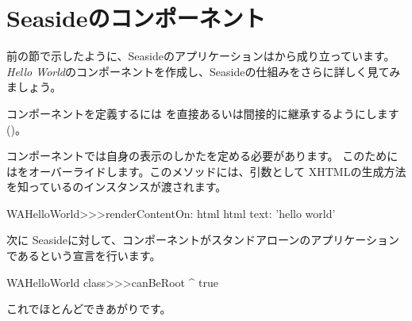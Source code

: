 \documentclass[a4paper,10pt,twoside]{book}
\begin{document}
\section{Seasideのコンポーネント}


前の節で示したように、Seasideのアプリケーションは\emph{}から成り立っています。
\emph{Hello World}のコンポーネントを作成し、Seasideの仕組みをさらに詳しく見てみましょう。

コンポーネントを定義するには を直接あるいは間接的に継承するようにします()。


コンポーネントでは自身の表示のしかたを定める必要があります。
このためにはをオーバーライドします。このメソッドには、引数として XHTMLの生成方法を知っているのインスタンスが渡されます。

\begin{code}{}
WAHelloWorld>>>renderContentOn: html
	html text: 'hello world'
\end{code}

\noindent
次に Seasideに対して、コンポーネントがスタンドアローンのアプリケーションであるという宣言を行います。


\begin{code}{}
WAHelloWorld class>>>canBeRoot
	^ true
\end{code}

\noindent
これでほとんどできあがりです。

\end{document}
